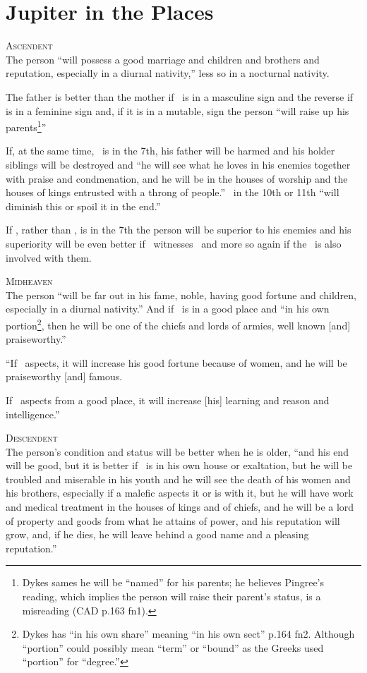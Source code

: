 \section{Jupiter in the Places}
\textsc{Ascendent} \hfill \\
The person ``will possess a good marriage and children and brothers and reputation, especially in a diurnal nativity,'' less so in a nocturnal nativity.

The father is better than the mother if \Jupiter\, is in a masculine sign and the reverse if \Jupiter\, is in a feminine sign and, if it is in a mutable, sign the person ``will raise up his parents\footnote{Dykes sames he will be ``named'' for his parents; he believes Pingree's reading, which implies the person will raise their parent's status, is a misreading (CAD p.163 fn1).}''

If, at the same time, \Saturn\, is in the 7th, his father will be harmed and his holder siblings will be destroyed and ``he will see what he loves in his enemies together with praise and condmenation, and he will be in the houses of worship and the houses of kings entrusted with a throng of people.'' \Mars\, in the 10th or 11th ``will diminish this or spoil it in the end.''

If \Mars, rather than \Saturn, is in the 7th the person will be superior to his enemies and his superiority will be even better if \Venus\, witnesses \Jupiter\, and more so again if the \Moon\, is also involved with them.

\vspace{0.5em}
\noindent\textsc{Midheaven} \hfill \\
\indent The person ``will be far out in his fame, noble, having good fortune and children, especially in a diurnal nativity.'' And if \Mars\, is in a good place and ``in his own portion\footnote{Dykes has ``in his own share'' meaning ``in his own sect'' p.164 fn2. Although ``portion'' could possibly mean ``term'' or ``bound'' as the Greeks used ``portion'' for ``degree.''}, then he will be one of the chiefs and lords of armies, well known [and] praiseworthy.''

``If \Venus\, aspects, it will increase his good fortune because of women, and he will be praiseworthy [and] famous.

If \Mercury\, aspects from a good place, it will increase [his] learning and reason and intelligence.''

\vspace{0.5em}
\noindent\textsc{Descendent} \hfill \\
\indent The person's condition and status will be better when he is older, ``and his end will be good, but it is better if \Jupiter\, is in his own house or exaltation, but he will be troubled and miserable in his youth and he will see the death of his women and his brothers, especially if a malefic aspects it or is with it, but he will have work and medical treatment in the houses of kings and of chiefs, and he will be a lord of property and goods from what he attains of power, and his reputation will grow, and, if he dies, he will leave behind a good name and a pleasing reputation.''

